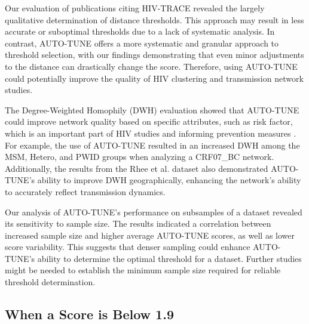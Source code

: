 \documentclass[utf8]{FrontiersinHarvard} %
\newcommand{\TODO}[1]{{\color{red}{#1}}}
\begin{document}
Our evaluation of publications citing HIV-TRACE revealed the largely
qualitative determination of distance thresholds. This approach may result in
less accurate or suboptimal thresholds due to a lack of systematic analysis. In
contrast, AUTO-TUNE offers a more systematic and granular approach to threshold
selection, with our findings demonstrating that even minor adjustments to the
distance can drastically change the score. Therefore, using AUTO-TUNE could
potentially improve the quality of HIV clustering and transmission network
studies.

The Degree-Weighted Homophily (DWH) evaluation showed that AUTO-TUNE could
improve network quality based on specific attributes, such as risk factor,
which is an important part of HIV studies and informing prevention measures
\cite{potterat_risk_2002,fujimoto_methodological_2021}. For example, the use of
AUTO-TUNE resulted in an increased DWH among the MSM, Hetero, and PWID groups
when analyzing a CRF07\_BC network. Additionally, the results from the Rhee et
al. dataset also demonstrated AUTO-TUNE's ability to improve DWH
geographically, enhancing the network's ability to accurately reflect
transmission dynamics.

Our analysis of AUTO-TUNE's performance on subsamples of a dataset revealed its
sensitivity to sample size. The results indicated a correlation between
increased sample size and higher average AUTO-TUNE scores, as well as lower
score variability. This suggests that denser sampling could enhance AUTO-TUNE's
ability to determine the optimal threshold for a dataset. Further studies might
be needed to establish the minimum sample size required for reliable threshold
determination.

\subsection{When a Score is Below 1.9}

\TODO{add some text to explain that multiple scores at different thresholds could be indicative of inherently different scales in the network, e.g. global AND local combined into one}
\end{document}
